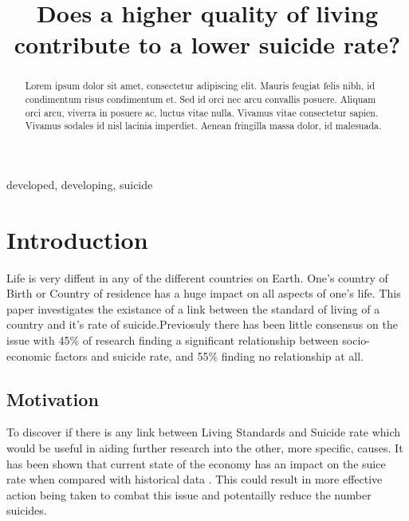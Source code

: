 \documentclass[conference]{IEEEtran}
\begin{document}
\title{Does a higher quality of living contribute to a lower suicide rate?\\
}

\author{
}

\maketitle

\begin{abstract}
    Lorem ipsum dolor sit amet, consectetur adipiscing elit. Mauris feugiat felis nibh, id condimentum risus condimentum et. Sed id orci nec arcu convallis posuere. Aliquam orci arcu, viverra in posuere ac, luctus vitae nulla. Vivamus vitae consectetur sapien. Vivamus sodales id nisl lacinia imperdiet. Aenean fringilla massa dolor, id malesuada.
\end{abstract}

\begin{IEEEkeywords}
developed, developing, suicide
\end{IEEEkeywords}

\section{Introduction}
Life is very diffent in any of the different countries on Earth. One's country of Birth or Country of residence
has a huge impact on all aspects of one's life. This paper investigates the existance of a link between
the standard of living of a country and it's rate of suicide.Previosuly there has been little consensus on the issue
with 45\% of research finding a significant relationship between socio-economic factors and suicide rate, and 55\%
finding no relationship at all\cite{sui_systematic_review}.

\subsection{Motivation}
To discover if there is any link between Living Standards and Suicide rate which would be useful in aiding further
research into the other, more specific, causes. It has been shown that current state of the economy
has an impact on the suice rate when compared with historical data \cite{Suicides_2008-10}. This could result in more effective action being taken to combat this
issue and potentailly reduce the number suicides.
\end{document}
